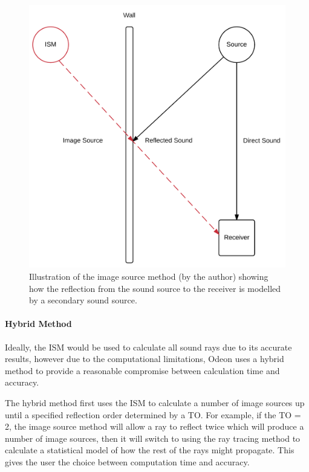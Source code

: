 \documentclass[../../main.tex]{subfiles}
\begin{document}
			\begin{figure}[H]
				\center\includegraphics[scale = 0.3]{Sections/Background/images/ISM.png}
				\caption{Illustration of the image source method (by the author) showing how the reflection from the sound source to the receiver is modelled by a secondary sound source.}
				\label{ISMPic}
			\end{figure}

		\paragraph{Hybrid Method}

			Ideally, the \ac{ISM} would be used to calculate all sound rays due to its accurate results, however due to the computational limitations, Odeon uses a hybrid method to provide a reasonable compromise between calculation time and accuracy.

			The hybrid method first uses the \ac{ISM} to calculate a number of image sources up until a specified reflection order determined by a \ac{TO}. For example, if the \ac{TO} = 2, the image source method will allow a ray to reflect twice which will produce a number of image sources, then it will switch to using the ray tracing method to calculate a statistical model of how the rest of the rays might propagate. This gives the user the choice between computation time and accuracy.
\end{document}
